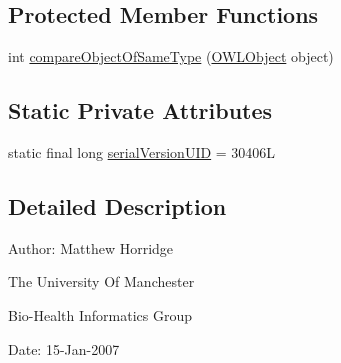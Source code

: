 \subsection*{Protected Member Functions}
\begin{DoxyCompactItemize}
\item 
int \hyperlink{classuk_1_1ac_1_1manchester_1_1cs_1_1owl_1_1owlapi_1_1_s_w_r_l_data_range_atom_impl_a74c36bf9dfd5b3094c0ca3a74f104e4d}{compare\-Object\-Of\-Same\-Type} (\hyperlink{interfaceorg_1_1semanticweb_1_1owlapi_1_1model_1_1_o_w_l_object}{O\-W\-L\-Object} object)
\end{DoxyCompactItemize}
\subsection*{Static Private Attributes}
\begin{DoxyCompactItemize}
\item 
static final long \hyperlink{classuk_1_1ac_1_1manchester_1_1cs_1_1owl_1_1owlapi_1_1_s_w_r_l_data_range_atom_impl_a326e34c384e57161bc9f3082e9535cbe}{serial\-Version\-U\-I\-D} = 30406\-L
\end{DoxyCompactItemize}


\subsection{Detailed Description}
Author\-: Matthew Horridge\par
 The University Of Manchester\par
 Bio-\/\-Health Informatics Group\par
 Date\-: 15-\/\-Jan-\/2007\par
\par
 


